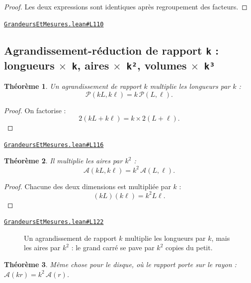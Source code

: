 \documentclass[11pt,a4paper]{article}
\theoremstyle{definition}
\theoremstyle{plain}
\newtheorem{theoreme}{Théorème}
\newcommand{\source}[2]{\par\smallskip\noindent\hfill{\footnotesize\href{#1}{\texttt{#2}}}\par\smallskip}
\begin{document}
\begin{proof}
Les deux expressions sont identiques après regroupement des facteurs.
\end{proof}
\source{https://github.com/Commutator-IO/learn-lean/blob/main/courses/01-college/04-grandeurs-et-mesures/GrandeursEtMesures.lean\#L110}{GrandeursEtMesures.lean\#L110}

\subsection{Agrandissement-réduction de rapport \texttt{k} : longueurs \texttt{\(\times\) k}, aires \texttt{\(\times\) k²}, volumes \texttt{\(\times\) k³}}

\begin{theoreme}
Un agrandissement de rapport $k$ multiplie les longueurs par $k$ :
\[ \mathcal{P}(kL, k\ell) = k\,\mathcal{P}(L, \ell) . \]
\end{theoreme}

\begin{proof}
On factorise :
\[ 2(kL + k\ell) = k \times 2(L + \ell) . \]
\end{proof}
\source{https://github.com/Commutator-IO/learn-lean/blob/main/courses/01-college/04-grandeurs-et-mesures/GrandeursEtMesures.lean\#L116}{GrandeursEtMesures.lean\#L116}

\begin{theoreme}
Il multiplie les aires par $k^2$ :
\[ \mathcal{A}(kL, k\ell) = k^2\,\mathcal{A}(L, \ell) . \]
\end{theoreme}

\begin{proof}
Chacune des deux dimensions est multipliée par $k$ :
\[ (kL)(k\ell) = k^2 L\ell . \]
\end{proof}
\source{https://github.com/Commutator-IO/learn-lean/blob/main/courses/01-college/04-grandeurs-et-mesures/GrandeursEtMesures.lean\#L122}{GrandeursEtMesures.lean\#L122}

\begin{figure}[h]
\centering

\caption{Un agrandissement de rapport $k$ multiplie les longueurs par $k$, mais les aires par $k^2$ : le grand carré se pave par $k^2$ copies du petit.}
\end{figure}

\begin{theoreme}
Même chose pour le disque, où le rapport porte sur le rayon :
$\mathcal{A}(kr) = k^2\,\mathcal{A}(r)$.
\end{theoreme}
\end{document}

